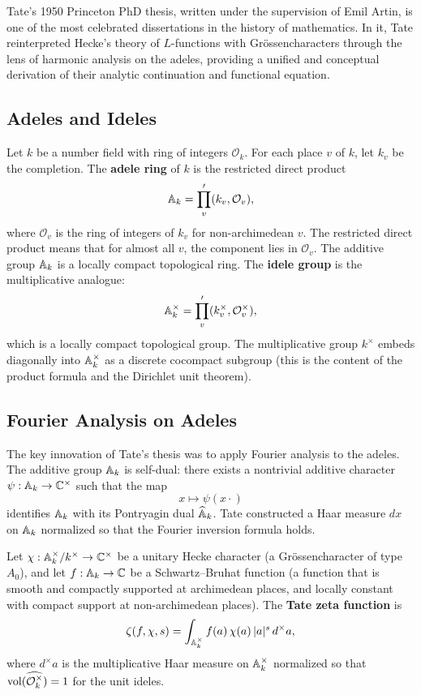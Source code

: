 Tate's 1950 Princeton PhD thesis, written under the supervision of Emil Artin, is one of the most celebrated dissertations in the history of mathematics. In it, Tate reinterpreted Hecke's theory of \(L\)-functions with Gr\"ossencharacters through the lens of harmonic analysis on the adeles, providing a unified and conceptual derivation of their analytic continuation and functional equation.

\subsection{Adeles and Ideles}

Let \(k\) be a number field with ring of integers \(\mathcal{O}_k\). For each place \(v\) of \(k\), let \(k_v\) be the completion. The \textbf{adele ring} of \(k\) is the restricted direct product
\[
\mathbb{A}_k = \prod_{v}' (k_v, \mathcal{O}_v),
\]
where \(\mathcal{O}_v\) is the ring of integers of \(k_v\) for non-archimedean \(v\). The restricted direct product means that for almost all \(v\), the component lies in \(\mathcal{O}_v\). The additive group \(\mathbb{A}_k\) is a locally compact topological ring. The \textbf{idele group} is the multiplicative analogue:
\[
\mathbb{A}_k^\times = \prod_{v}' (k_v^\times, \mathcal{O}_v^\times),
\]
which is a locally compact topological group. The multiplicative group \(k^\times\) embeds diagonally into \(\mathbb{A}_k^\times\) as a discrete cocompact subgroup (this is the content of the product formula and the Dirichlet unit theorem).

\subsection{Fourier Analysis on Adeles}

The key innovation of Tate's thesis was to apply Fourier analysis to the adeles. The additive group \(\mathbb{A}_k\) is self-dual: there exists a nontrivial additive character \(\psi: \mathbb{A}_k \to \mathbb{C}^\times\) such that the map
\[
x \mapsto \psi(x \cdot)
\]
identifies \(\mathbb{A}_k\) with its Pontryagin dual \(\widehat{\mathbb{A}}_k\). Tate constructed a Haar measure \(dx\) on \(\mathbb{A}_k\) normalized so that the Fourier inversion formula holds.

\begin{definition}
Let \(\chi: \mathbb{A}_k^\times / k^\times \to \mathbb{C}^\times\) be a unitary Hecke character (a Gr\"ossencharacter of type \(A_0\)), and let \(f: \mathbb{A}_k \to \mathbb{C}\) be a Schwartz--Bruhat function (a function that is smooth and compactly supported at archimedean places, and locally constant with compact support at non-archimedean places). The \textbf{Tate zeta function} is
\[
\zeta(f, \chi, s) = \int_{\mathbb{A}_k^\times} f(a) \, \chi(a) \, |a|^s \, d^\times a,
\]
where \(d^\times a\) is the multiplicative Haar measure on \(\mathbb{A}_k^\times\) normalized so that \(\operatorname{vol}(\widehat{\mathcal{O}_k^\times}) = 1\) for the unit ideles.
\end{definition}

